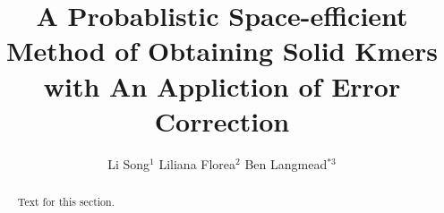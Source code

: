 \documentclass[10pt]{article}
\begin{document}

\title{A Probablistic Space-efficient Method of Obtaining Solid Kmers with An Appliction of Error Correction}
 


\author{Li Song$^1$%
       Liliana Florea$^2$
      Ben Langmead$^{*3}$ %
      }
\date{}     


\maketitle



\begin{abstract}
Text for this section.        
\end{abstract}
\end{document}

